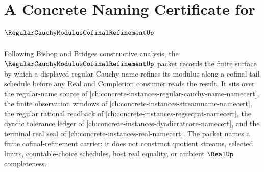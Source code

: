 \chapter{A Concrete Naming Certificate for $\RegularCauchyModulusCofinalRefinementUp$}
\label{ch:concrete-instances-regular-cauchy-modulus-cofinal-refinement-namecert}

Following Bishop and Bridges constructive analysis, the $\RegularCauchyModulusCofinalRefinementUp$ packet records the finite surface by which a displayed regular Cauchy name refines its modulus along a cofinal tail schedule before any Real and Completion consumer reads the result. It sits over the regular-name source of \autoref{ch:concrete-instances-regular-cauchy-name-namecert}, the finite observation windows of \autoref{ch:concrete-instances-streamname-namecert}, the regular rational readback of \autoref{ch:concrete-instances-regseqrat-namecert}, the dyadic tolerance ledger of \autoref{ch:concrete-instances-dyadicratcore-namecert}, and the terminal real seal of \autoref{ch:concrete-instances-real-namecert}. The packet names a finite cofinal-refinement carrier; it does not construct quotient streams, selected limits, countable-choice schedules, host real equality, or ambient $\RealUp$ completeness.

